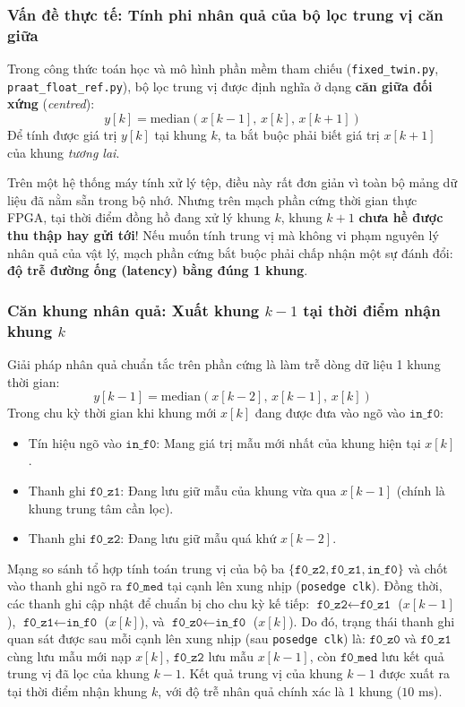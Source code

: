 \subsubsection*{Vấn đề thực tế: Tính phi nhân quả của bộ lọc trung vị căn giữa}
Trong công thức toán học và mô hình phần mềm tham chiếu (\texttt{fixed\_twin.py}, \texttt{praat\_float\_ref.py}), bộ lọc trung vị được định nghĩa ở dạng \textbf{căn giữa đối xứng} (\emph{centred}):
\begin{equation}
    y[k] = \text{median}(x[k-1],\, x[k],\, x[k+1])
\end{equation}
Để tính được giá trị $y[k]$ tại khung $k$, ta bắt buộc phải biết giá trị $x[k+1]$ của khung \emph{tương lai}.

Trên một hệ thống máy tính xử lý tệp, điều này rất đơn giản vì toàn bộ mảng dữ liệu đã nằm sẵn trong bộ nhớ. Nhưng trên mạch phần cứng thời gian thực FPGA, tại thời điểm đồng hồ đang xử lý khung $k$, khung $k+1$ \textbf{chưa hề được thu thập hay gửi tới}!
Nếu muốn tính trung vị mà không vi phạm nguyên lý nhân quả của vật lý, mạch phần cứng bắt buộc phải chấp nhận một sự đánh đổi: \textbf{độ trễ đường ống (latency) bằng đúng 1 khung}.

\subsubsection*{Căn khung nhân quả: Xuất khung $k-1$ tại thời điểm nhận khung $k$}
Giải pháp nhân quả chuẩn tắc trên phần cứng là làm trễ dòng dữ liệu 1 khung thời gian:
\begin{equation}
    y[k-1] = \text{median}(x[k-2],\, x[k-1],\, x[k])
\end{equation}
Trong chu kỳ thời gian khi khung mới $x[k]$ đang được đưa vào ngõ vào $\texttt{in\_f0}$:
\begin{itemize}
    \item Tín hiệu ngõ vào $\texttt{in\_f0}$: Mang giá trị mẫu mới nhất của khung hiện tại $x[k]$.
    \item Thanh ghi $\texttt{f0\_z1}$: Đang lưu giữ mẫu của khung vừa qua $x[k-1]$ (chính là khung trung tâm cần lọc).
    \item Thanh ghi $\texttt{f0\_z2}$: Đang lưu giữ mẫu quá khứ $x[k-2]$.
\end{itemize}
Mạng so sánh tổ hợp tính toán trung vị của bộ ba $\{\texttt{f0\_z2}, \texttt{f0\_z1}, \texttt{in\_f0}\}$ và chốt vào thanh ghi ngõ ra $\texttt{f0\_med}$ tại cạnh lên xung nhịp (\texttt{posedge clk}). Đồng thời, các thanh ghi cập nhật để chuẩn bị cho chu kỳ kế tiếp: $\texttt{f0\_z2} \leftarrow \texttt{f0\_z1}$ ($x[k-1]$), $\texttt{f0\_z1} \leftarrow \texttt{in\_f0}$ ($x[k]$), và $\texttt{f0\_z0} \leftarrow \texttt{in\_f0}$ ($x[k]$).
Do đó, trạng thái thanh ghi quan sát được sau mỗi cạnh lên xung nhịp (sau \texttt{posedge clk}) là: $\texttt{f0\_z0}$ và $\texttt{f0\_z1}$ cùng lưu mẫu mới nạp $x[k]$, $\texttt{f0\_z2}$ lưu mẫu $x[k-1]$, còn $\texttt{f0\_med}$ lưu kết quả trung vị đã lọc của khung $k-1$. Kết quả trung vị của khung $k-1$ được xuất ra tại thời điểm nhận khung $k$, với độ trễ nhân quả chính xác là 1 khung ($10\text{ ms}$).

